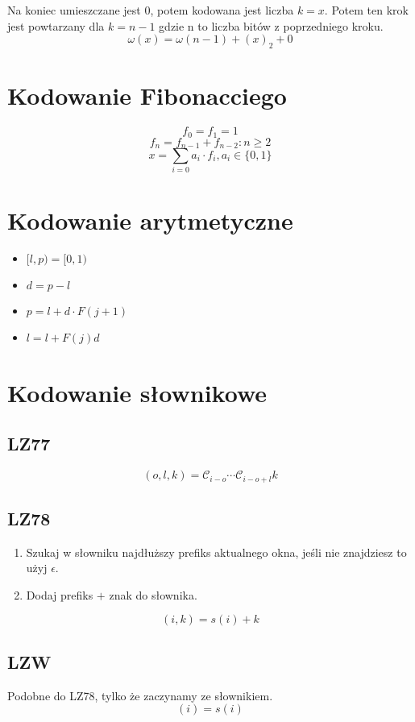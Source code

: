 \documentclass{../notatki}
\begin{document}
\begin{multicols}{2}
  Na koniec umieszczane jest $0$, potem kodowana jest liczba $k=x$. Potem ten
  krok jest powtarzany dla $k=n - 1$ gdzie n to liczba bitów z
  poprzedniego kroku.
  $$
  \omega(x) = \omega(n - 1) + (x)_2 + 0
  $$

  \section{Kodowanie Fibonacciego}

  $$
  f_0=f_1=1
  $$
  $$
  f_n = f_{n-1} + f_{n-2}: n \geq 2
  $$
  $$
  x = \sum_{i=0} a_i \cdot f_i, a_i \in \{0,1\}
  $$

  \section{Kodowanie arytmetyczne}

  \begin{itemize}
    \item $[l, p)=[0, 1)$
    \item $d = p - l$
    \item $p = l + d \cdot F(j + 1)$
    \item $l = l + F(j)d$
  \end{itemize}

  \section{Kodowanie słownikowe}

  \subsection{LZ77}

  $$
  (o, l, k) = \mathcal{C}_{i - o} \cdots \mathcal{C}_{i - o + l} k
  $$

  \subsection{LZ78}

  \begin{enumerate}
    \item Szukaj w słowniku najdłuższy prefiks aktualnego okna, jeśli
      nie znajdziesz to użyj $\epsilon$.
    \item Dodaj prefiks $+$ znak do słownika.
  \end{enumerate}

  $$
  (i, k) = s(i) + k
  $$

  \subsection{LZW}

  Podobne do LZ78, tylko że zaczynamy ze słownikiem.
  $$
  (i) = s(i)
  $$

\end{multicols}
\end{document}

